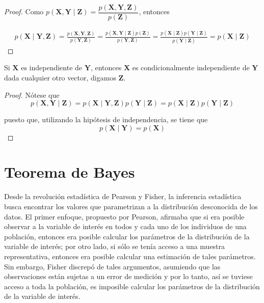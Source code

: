 \begin{proof}
Como $p(\mathbf{X},\mathbf{Y} \mid \mathbf{Z})=\dfrac{p(\mathbf{X},\mathbf{Y},\mathbf{Z})}{p(\mathbf{Z})}$, entonces

\begin{align*}
p(\mathbf{X} \mid \mathbf{Y},\mathbf{Z})=\frac{p(\mathbf{X},\mathbf{Y},\mathbf{Z})}{p(\mathbf{Y},\mathbf{Z})}
=\frac{p(\mathbf{X},\mathbf{Y} \mid \mathbf{Z})p(\mathbf{Z})}{p(\mathbf{Y},\mathbf{Z})}
=\frac{p(\mathbf{X} \mid \mathbf{Z})p(\mathbf{Y} \mid \mathbf{Z})}{p(\mathbf{Y} \mid \mathbf{Z})}=p(\mathbf{X} \mid \mathbf{Z})
\end{align*}
\end{proof}

\begin{Res}
Si $\mathbf{X}$ es independiente de $\mathbf{Y}$, entonces $\mathbf{X}$ es condicionalmente independiente de $\mathbf{Y}$ dada cualquier otro vector, digamos $\mathbf{Z}$.
\end{Res}

\begin{proof}
Nótese que
\begin{equation*}
p(\mathbf{X},\mathbf{Y}\mid \mathbf{Z})=p(\mathbf{X} \mid \mathbf{Y},\mathbf{Z})p(\mathbf{Y} \mid \mathbf{Z})=p(\mathbf{X} \mid \mathbf{Z})p(\mathbf{Y} \mid \mathbf{Z})
\end{equation*}

puesto que, utilizando la hipótesis de independencia, se tiene que
\begin{equation*}
p(\mathbf{X} \mid \mathbf{Y})=p(\mathbf{X})
\end{equation*}
\end{proof}

\section{Teorema de Bayes}

Desde la revolución estadística de Pearson y Fisher, la inferencia estadística busca encontrar los valores que parametrizan a la distribución desconocida de los datos. El primer enfoque, propuesto por Pearson, afirmaba que si era posible observar a la variable de interés en todos y cada uno de los individuos de una población, entonces era posible calcular los parámetros de la distribución de la variable de interés; por otro lado, si sólo se tenía acceso a una muestra representativa, entonces era posible calcular una estimación de tales parámetros. Sin embargo, Fisher discrepó de tales argumentos, asumiendo que las observaciones están sujetas a un error de medición y por lo tanto, así se tuviese acceso a toda la población, es imposible calcular los parámetros de la distribución de la variable de interés.

